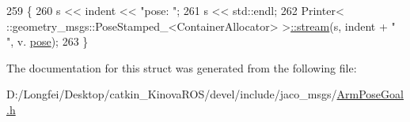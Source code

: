 \begin{DoxyCode}
259   \{
260     s << indent << \textcolor{stringliteral}{"pose: "};
261     s << std::endl;
262     Printer< ::geometry\_msgs::PoseStamped\_<ContainerAllocator> >\hyperlink{structros_1_1message__operations_1_1Printer_3_01_1_1jaco__msgs_1_1ArmPoseGoal___3_01ContainerAllocator_01_4_01_4_ae60c2da5eae342b59c0a26effed778ab}{::stream}(s, indent + \textcolor{stringliteral}{"  "}, v.
      \hyperlink{structjaco__msgs_1_1ArmPoseGoal___a3c02a8adbfcd7515a82e5a4746118e05}{pose});
263   \}
\end{DoxyCode}


The documentation for this struct was generated from the following file\+:\begin{DoxyCompactItemize}
\item 
D\+:/\+Longfei/\+Desktop/catkin\+\_\+\+Kinova\+R\+O\+S/devel/include/jaco\+\_\+msgs/\hyperlink{ArmPoseGoal_8h}{Arm\+Pose\+Goal.\+h}\end{DoxyCompactItemize}
